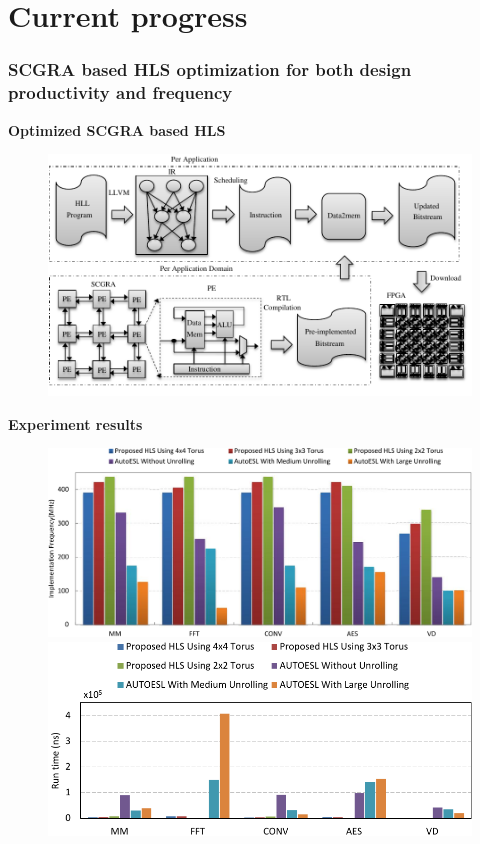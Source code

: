 \documentclass{beamer}
\begin{document}
\section{Current progress}
\begin{frame}[t]
\frametitle{SCGRA based HLS optimization for both design productivity and frequency}

\vspace{-1em}
\textbf{Optimized SCGRA based HLS}
\begin{figure}
\vspace{-1em}
\includegraphics[width=0.75\linewidth]{design-flow}
\vspace{-1em}
\end{figure}

\textbf{Experiment results}
\begin{figure}
\includegraphics[width=0.5\linewidth]{impl_freq}
\includegraphics[width=0.5\linewidth]{performanceCP}
\end{figure}

\end{frame}
\end{document}
